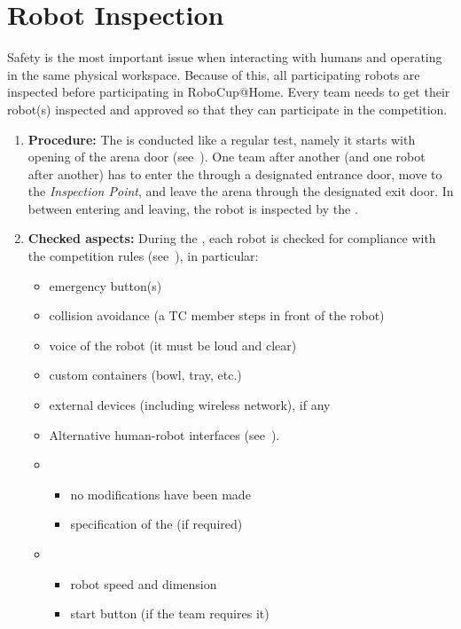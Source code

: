 \section{Robot Inspection}
\label{sec:robot_inspection}
Safety is the most important issue when interacting with humans and operating in the same physical workspace. Because of this, all participating robots are inspected before participating in RoboCup@Home. Every team needs to get their robot(s) inspected and approved so that they can participate in the competition.

\begin{enumerate}
	\item \textbf{Procedure:} The \RobotInspection{} is conducted like a regular test, namely it starts with opening of the arena door (see~). One team after another (and one robot after another) has to enter the \Arena{} through a designated entrance door, move to the \textit{Inspection Point}, and leave the arena through the designated exit door. In between entering and leaving, the robot is inspected by the \TC.
	\item \textbf{Checked aspects:} During the \RobotInspection{}, each robot is checked for compliance with the competition rules (see~), in particular:
	\begin{itemize}
		\item emergency button(s)
		\item collision avoidance (a TC member steps in front of the robot)
		\item voice of the robot (it must be loud and clear)
		\item custom containers (bowl, tray, etc.)
		\item external devices (including wireless network), if any
		\item Alternative human-robot interfaces (see~).
		\item {}
		\begin{itemize}
			\item no modifications have been made
			\item specification of the  (if required)
		\end{itemize}
		\item {}
		\begin{itemize}
			\item robot speed and dimension
			\item start button (if the team requires it)

\end{itemize}
\end{itemize}
\end{enumerate}
